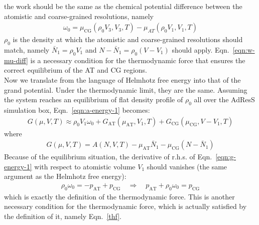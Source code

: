 \documentclass[aip,jcp,a4paper,reprint,onecolumn]{revtex4-1}
\newcommand{\recheck}[1]{{\color{red} #1}}
\newcommand{\vect}[1]{\textbf{\textit{#1}}}
\newcommand{\dd}[1]{\textsf{#1}}
\newcommand{\AT}{{\textrm{{AT}}}}
\newcommand{\CG}{{\textrm{CG}}}
\begin{document}
the work should be the same as the
chemical potential difference between the atomistic and coarse-grained
resolutions, namely
\begin{align}\label{eqn:w-mu-diff}
  \omega_0 = \mu_{\CG}(\rho_0V_3, V_3, T) - \mu_{AT}(\rho_0 V_1, V_1, T)
\end{align}
$\rho_0$ is the density at which the atomistic and coarse-grained
resolutions should match,
namely $\bar N_1 = \rho_0V_1$ and $N - \bar N_1 = \rho_0(V - V_1)$ should apply.
Eqn.~\eqref{eqn:w-mu-diff} is a necessary
condition for the thermodynamic force that ensures
the correct equilibrium of the AT and CG regions.\\

\noindent
Now we translate from the language of Helmhotz free
energy into that of the grand potential.
Under the thermodynamic limit, they are the same.
Assuming the system reaches an
equilibrium of flat density profile of $\rho_0$ all over the AdResS simulation box, 
Eqn.~\eqref{eqn:a-energy-1} becomes:
\begin{align}\label{eqn:g-energy-1}
  G(\mu, V, T) \approx
  \rho_0V_1\omega_0
  + G_{\AT}(\mu_{\AT}, V_1, T) + G_{\CG}(\mu_{\CG}, V - V_1, T)
\end{align}
where
\begin{align}
  G(\mu, V, T) = A(N, V, T) - \mu_{\AT} \bar N_1 - \mu_{\CG}(N - \bar N_1)
\end{align}
Because of the equilibrium situation, the derivative of r.h.s. of
Eqn.~\eqref{eqn:g-energy-1} with respect to atomistic volume $V_1$
should vanishes (the same argument as the Helmhotz free energy):
\begin{align}
  \rho_0\omega_0 = -p_{\AT}+p_{\CG} \quad\Longrightarrow\quad
  p_{\AT} + \rho_0\omega_0 = p_{\CG}
\end{align}
which is exactly the definition of the thermodynamic force.
This is another necessary condition for the
thermodynamic force, which is actually satisfied by the definition of it,
namely Eqn.~\eqref{thf}.
\end{document}
